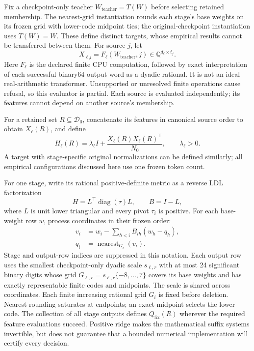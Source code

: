 \documentclass[11pt]{article}
\makeatletter
\def\paragraph{\@startsection{paragraph}{4}{\z@}{1.5ex plus
   0.5ex minus .2ex}{-1em}{\normalsize\bfseries}}
\newcommand{\Q}{\mathbb{Q}}
\newcommand{\calD}{\mathcal{D}}
\newcommand{\Qfix}{Q_{\mathrm{fix}}}
\makeatother
\begin{document}
Fix a checkpoint-only teacher $W_{\mathrm{teacher}}=T(W)$ before selecting
retained membership. The nearest-grid instantiation rounds each stage's base
weights on its frozen grid with lower-code midpoint ties; the original-checkpoint
instantiation uses $T(W)=W$. These define distinct targets, whose empirical
results cannot be transferred between them. For source $j$, let
\[
 X_{\ell j}=F_\ell(W_{\mathrm{teacher}},j)
       \in\Q^{d_\ell\times t_j}.
\]
Here $F_\ell$ is the declared finite CPU computation, followed by exact
interpretation of each successful binary64 output word as a dyadic rational.
It is not an ideal real-arithmetic transformer. Unsupported or unresolved finite
operations cause refusal, so this evaluator is partial. Each source is evaluated
independently; its features cannot depend on another source's membership.

For a retained set $R\subseteq\calD_0$, concatenate its features in canonical
source order to obtain $X_\ell(R)$, and define
\begin{equation}
 H_\ell(R)=\lambda_\ell I+
   \frac{X_\ell(R)X_\ell(R)^\top}{N_0},
 \qquad \lambda_\ell>0.
 \label{eq:metric}
\end{equation}
A target with stage-specific original normalizations can be defined similarly;
all empirical configurations discussed here use one frozen token count.

\paragraph{Exact adaptive rounding.}
For one stage, write its rational positive-definite metric as a reverse LDL
factorization
\[
 H=L^\top\operatorname{diag}(\tau)L,
 \qquad B=I-L,
\]
where $L$ is unit lower triangular and every pivot $\tau_i$ is positive. For each
base-weight row $w$, process coordinates in their frozen order:
\begin{align}
 v_i&=w_i-\sum_{h<i} B_{ih}(w_h-q_h),\label{eq:recurrence}\\
 q_i&=\operatorname{nearest}_{G_i}(v_i).
 \label{eq:rounding}
\end{align}
Stage and output-row indices are suppressed in this notation. Each output row
uses the smallest checkpoint-only dyadic scale $s_{\ell,r}$ with at most 24
significant binary digits whose grid
$G_{\ell,r}=s_{\ell,r}\{-8,\ldots,7\}$ covers its base weights and has exactly
representable finite codes and midpoints. The scale is shared across coordinates.
Each finite increasing rational grid $G_i$ is fixed before deletion. Nearest
rounding saturates at endpoints; an exact midpoint selects the lower code. The
collection of all stage outputs defines $\Qfix(R)$ wherever the required feature
evaluations succeed. Positive ridge makes the mathematical suffix systems
invertible, but does not guarantee that a bounded numerical implementation will
certify every decision.
\end{document}
